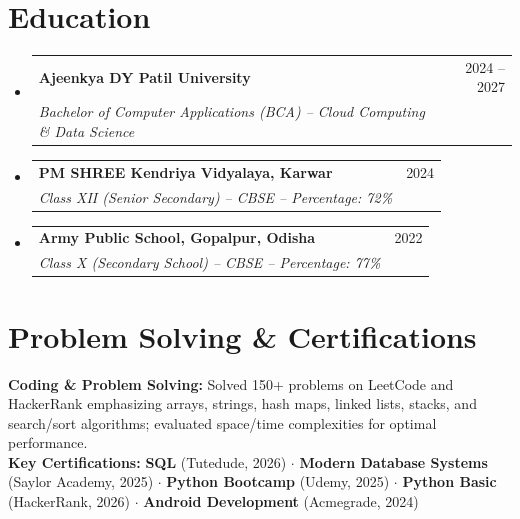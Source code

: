 \documentclass[letterpaper,10pt]{article}
\makeatletter
\newcommand{\resumeSubheading}[4]{
  \item
    \begin{tabular*}{0.98\textwidth}[t]{l@{\extracolsep{\fill}}r}
      \textbf{#1} & \small #2 \\
      \textit{\small#3} & \textit{\small #4} \\
    \end{tabular*}\vspace{-5pt}
}
\newcommand{\resumeSubHeadingListStart}{\begin{itemize}[leftmargin=0.12in, label={}, itemsep=1pt, topsep=1pt, parsep=0pt]}
\newcommand{\resumeSubHeadingListEnd}{\end{itemize}\vspace{-2pt}}
\makeatother
\begin{document}
\section{Education}
  \resumeSubHeadingListStart
    \resumeSubheading
      {Ajeenkya DY Patil University}{2024 -- 2027}
      {Bachelor of Computer Applications (BCA) -- Cloud Computing \& Data Science}{}
    \resumeSubheading
      {PM SHREE Kendriya Vidyalaya, Karwar}{2024}
      {Class XII (Senior Secondary) -- CBSE -- Percentage: 72\%}{}
    \resumeSubheading
      {Army Public School, Gopalpur, Odisha}{2022}
      {Class X (Secondary School) -- CBSE -- Percentage: 77\%}{}
  \resumeSubHeadingListEnd

\section{Problem Solving \& Certifications}
  \resumeSubHeadingListStart
    \small{\item{
      \textbf{Coding \& Problem Solving:} Solved 150+ problems on LeetCode and HackerRank emphasizing arrays, strings, hash maps, linked lists, stacks, and search/sort algorithms; evaluated space/time complexities for optimal performance. \\ \vspace{1pt}
      \textbf{Key Certifications:}
      \textbf{SQL} (Tutedude, 2026) $\cdot$
      \textbf{Modern Database Systems} (Saylor Academy, 2025) $\cdot$
      \textbf{Python Bootcamp} (Udemy, 2025) $\cdot$
      \textbf{Python Basic} (HackerRank, 2026) $\cdot$
      \textbf{Android Development} (Acmegrade, 2024)
    }}
  \resumeSubHeadingListEnd
\end{document}
